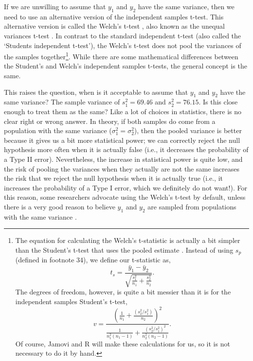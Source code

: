 \documentclass[
]{scrbook}
\begin{document}
If we are unwilling to assume that \(y_{1}\) and \(y_{2}\) have the same variance, then we need to use an alternative version of the independent samples t-test.
This alternative version is called the Welch's t-test \citep{Welch1938}, also known as the unequal variances t-test \citep{Dytham2011, Ruxton2006}.
In contrast to the standard independent t-test (also called the `Students independent t-test'), the Welch's t-test does not pool the variances of the samples together\footnote{The equation for calculating the Welch's t-statistic is actually a bit simpler than the Student's t-test that uses the pooled estimate \citep{Ruxton2006}. Instead of using \(s_{p}\) (defined in footnote 34), we define our t-statistic as, \[t_{s} = \frac{\bar{y}_{1} - \bar{y}_{2}}{ \sqrt{ \frac{s^{2}_{1}}{n_{1}} + \frac{s^{2}_{2}}{n_{2}}} }.\] The degrees of freedom, however, is quite a bit messier than it is for the independent samples Student's t-test, \[v = \frac{\left(\frac{1}{n_{1}} + \frac{(s^{2}_{2} / s^{2}_{1})}{n_{2}} \right)^{2}}{\frac{1}{n^{2}_{1}\left(n_{1} - 1 \right)} + \frac{(s^{2}_{2} / s^{2}_{1})^{2}}{n^{2}_{2}\left(n_{2} - 1 \right)}}.\] Of course, Jamovi and R will make these calculations for us, so it is not necessary to do it by hand.}.
While there are some mathematical differences between the Student's and Welch's independent samples t-tests, the general concept is the same.

This raises the question, when is it acceptable to assume that \(y_{1}\) and \(y_{2}\) have the same variance?
The sample variance of \(s^{2}_{1} = 69.46\) and \(s^{2}_{2} = 76.15\).
Is this close enough to treat them as the same?
Like a lot of choices in statistics, there is no clear right or wrong answer.
In theory, if both samples do come from a population with the same variance (\(\sigma^{2}_{1} = \sigma^{2}_{2}\)), then the pooled variance is better because it gives us a bit more statistical power; we can correctly reject the null hypothesis more often when it is actually false (i.e., it decreases the probability of a Type II error).
Nevertheless, the increase in statistical power is quite low, and the risk of pooling the variances when they actually are not the same increases the risk that we reject the null hypothesis when it is actually true (i.e., it increases the probability of a Type I error, which we definitely do not want!).
For this reason, some researchers advocate using the Welch's t-test by default, unless there is a very good reason to believe \(y_{1}\) and \(y_{2}\) are sampled from populations with the same variance \citep{Ruxton2006, Delacre2017}.
\end{document}

